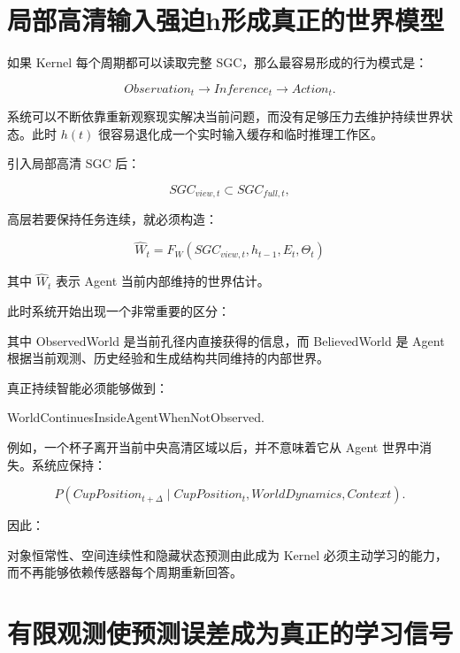 \section{局部高清输入强迫h形成真正的世界模型}

如果 Kernel 每个周期都可以读取完整 SGC，那么最容易形成的行为模式是：

\[
Observation_t
\rightarrow
Inference_t
\rightarrow
Action_t.
\]

系统可以不断依靠重新观察现实解决当前问题，而没有足够压力去维护持续世界状态。此时 $h(t)$ 很容易退化成一个实时输入缓存和临时推理工作区。

引入局部高清 SGC 后：

\[
SGC_{view,t}
\subset
SGC_{full,t},
\]

高层若要保持任务连续，就必须构造：

\[
\boxed{
\hat W_t
=
F_W
\left(
SGC_{view,t},
h_{t-1},
E_t,
\Theta_t
\right)
}
\]

其中 $\hat W_t$ 表示 Agent 当前内部维持的世界估计。

此时系统开始出现一个非常重要的区分：

\begin{statementbox}
\centering
{}
\end{statementbox}

其中 ObservedWorld 是当前孔径内直接获得的信息，而 BelievedWorld 是 Agent 根据当前观测、历史经验和生成结构共同维持的内部世界。

真正持续智能必须能够做到：

\begin{statementbox}
WorldContinuesInsideAgentWhenNotObserved.
\end{statementbox}

例如，一个杯子离开当前中央高清区域以后，并不意味着它从 Agent 世界中消失。系统应保持：

\[
P(
CupPosition_{t+\Delta}
\mid
CupPosition_t,
WorldDynamics,
Context
).
\]

因此：

\begin{statementbox}
\centering
{}
\end{statementbox}

对象恒常性、空间连续性和隐藏状态预测由此成为 Kernel 必须主动学习的能力，而不再能够依赖传感器每个周期重新回答。

\section{有限观测使预测误差成为真正的学习信号}

